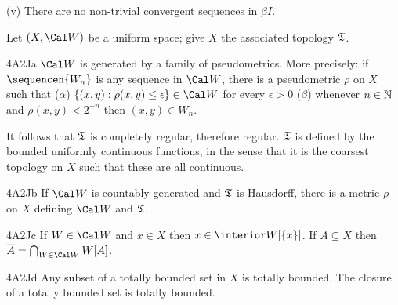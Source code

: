 \quad(v) There are no non-trivial convergent sequences in
$\beta I$.


  Let
$(X,\Cal W)$ be a uniform space;  give $X$ the associated topology
$\frak T$.

\spheader 4A2Ja $\Cal W$ is generated by a family of pseudometrics.
   More precisely:  if $\sequencen{W_n}$ is any sequence in
$\Cal W$, there is a pseudometric $\rho$ on $X$ such that ($\alpha$)
$\{(x,y):\rho(x,y)\le\epsilon\}\in\Cal W$ for every $\epsilon>0$
($\beta$) whenever $n\in\Bbb N$ and $\rho(x,y)<2^{-n}$ then
$(x,y)\in W_n$.

It follows that $\frak T$ is completely regular, therefore
regular.
$\frak T$ is defined by the bounded uniformly continuous functions, in
the sense that it is the coarsest topology on $X$
such that these are all continuous.   

\spheader 4A2Jb
If $\Cal W$ is countably generated and $\frak T$ is
Hausdorff, there is a metric $\rho$ on $X$ defining $\Cal W$ and
$\frak T$.  

\spheader 4A2Jc
If $W\in\Cal W$ and $x\in X$ then $x\in\interior W[\{x\}]$.
   If $A\subseteq X$ then
$\overline{A}=\bigcap_{W\in\Cal W}W[A]$.   

\spheader 4A2Jd Any subset of a totally bounded set in $X$ is totally
bounded.
The closure of a totally bounded set is totally bounded.

